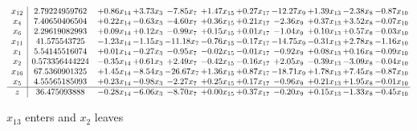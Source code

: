 \documentclass[9pt]{article}
\begin{document}
 \[\begin{array}{c| c c@{\hskip 2pt} c@{\hskip 2pt} c@{\hskip 2pt} c@{\hskip 2pt} c@{\hskip 2pt} c@{\hskip 2pt} c@{\hskip 2pt} c@{\hskip 2pt} c@{\hskip 2pt} }
 x_{12}   &  2.79224959762 & +  0.86 x_{14} & +  3.73 x_{3} & -7.85 x_{7} & +  1.47 x_{15} & +  0.27 x_{17} & -12.27 x_{9} & +  1.39 x_{13} & -2.38 x_{8} & -0.87 x_{10}\\
 x_{4}   &  7.40650406504 & +  0.22 x_{14} & -0.63 x_{3} & -4.60 x_{7} & +  0.36 x_{15} & +  0.21 x_{17} & -2.36 x_{9} & +  0.37 x_{13} & +  3.52 x_{8} & -0.07 x_{10}\\
 x_{6}   &  2.29619082993 & +  0.09 x_{14} & +  0.12 x_{3} & -0.99 x_{7} & +  0.15 x_{15} & +  0.01 x_{17} & -1.04 x_{9} & +  0.10 x_{13} & +  0.57 x_{8} & -0.03 x_{10}\\
 x_{11}   &  41.575543725 & -1.23 x_{14} & -1.15 x_{3} & -11.18 x_{7} & -0.76 x_{15} & -0.17 x_{17} & -14.75 x_{9} & -0.31 x_{13} & +  2.78 x_{8} & -1.16 x_{10}\\
 x_{1}   &  5.54145516074 & +  0.01 x_{14} & -0.27 x_{3} & -0.95 x_{7} & -0.02 x_{15} & -0.01 x_{17} & -0.92 x_{9} & +  0.08 x_{13} & +  0.16 x_{8} & -0.09 x_{10}\\
 x_{2}   &  0.573356444224 & -0.35 x_{14} & +  0.61 x_{3} & +  2.49 x_{7} & -0.42 x_{15} & -0.16 x_{17} & +  2.05 x_{9} & -0.39 x_{13} & -3.09 x_{8} & -0.04 x_{10}\\
 x_{16}   &  67.5360901325 & +  1.45 x_{14} & -8.54 x_{3} & -26.67 x_{7} & +  1.36 x_{15} & +  0.87 x_{17} & -18.71 x_{9} & +  1.78 x_{13} & +  7.45 x_{8} & -0.87 x_{10}\\
 x_{5}   &  4.55565185093 & +  0.23 x_{14} & -0.98 x_{3} & -2.27 x_{7} & +  0.25 x_{15} & +  0.17 x_{17} & -0.96 x_{9} & +  0.21 x_{13} & +  1.95 x_{8} & -0.01 x_{10}\\
\hline
z    &  36.475093888 & -0.28 x_{14} & -6.06 x_{3} & -8.70 x_{7} & +  0.00 x_{15} & +  0.37 x_{17} & -0.20 x_{9} & +  0.15 x_{13} & -1.33 x_{8} & -0.45 x_{10}\\
\end{array}\]


 $ x_{13} $ enters and $ x_{2} $ leaves 
\end{document}
